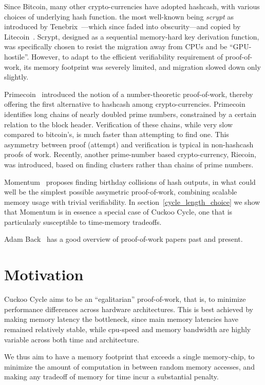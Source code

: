 \documentclass[11pt, oneside]{article}
\begin{document}
Since Bitcoin, many other crypto-currencies have adopted hashcash, with various
choices of underlying hash function. the most well-known being {\em scrypt} as
introduced by Tenebrix~\cite{tenebrix2011}---which since faded into obscurity---and
copied by Litecoin~\cite{litecoin2011}.
Scrypt, designed as a sequential memory-hard key derivation function,
was specifically chosen to resist the migration away from CPUs and be ``GPU-hostile''.
However, to adapt to the efficient verifiability requirement of proof-of-work, its
memory footprint was severely limited, and migration slowed down only slightly.

Primecoin~\cite{king2013} introduced the notion of a number-theoretic proof-of-work,
thereby offering the first alternative to hashcash among crypto-currencies.
Primecoin identifies long chains of nearly doubled prime numbers, constrained
by a certain relation to the block header.
Verification of these chains, while very slow compared to bitcoin's, is much faster
than attempting to find one.
This asymmetry between proof (attempt) and verification is typical in non-hashcash proofs of work.
Recently, another prime-number based crypto-currency, Riecoin, was introduced, based
on finding clusters rather than chains of prime numbers.

Momentum~\cite{larimer2013} proposes finding birthday collisions of hash outputs,
in what could well be the simplest possible assymetric proof-of-work,
combining scalable memory usage with trivial verifiability.
In section~\ref{cycle_length_choice} we show that Momentum is in essence a special case of Cuckoo Cycle,
one that is particularly susceptible to time-memory tradeoffs.

Adam Back~\cite{back2014} has a good overview of proof-of-work papers past and present.

\section{Motivation}
Cuckoo Cycle aims to be an ``egalitarian'' proof-of-work, that is, to minimize performance differences
across hardware architectures. This is best achieved by making memory latency the bottleneck, since
main memory latencies have remained relatively stable, while cpu-speed and memory bandwidth are highly
variable across both time and architecture.

We thus aim to have a memory footprint that exceeds a single memory-chip, to minimize the amount
of computation in between random memory accesses, and making any tradeoff of memory for time
incur a substantial penalty.
\end{document}
